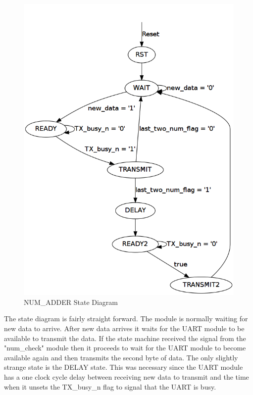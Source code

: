 \documentclass{article}
\begin{document}
	\begin{figure}[h]
		\begin{center}
			\includegraphics[scale=0.3]{../dot/Part-6_state_machine.png}
			\caption{NUM\_ADDER State Diagram}
		\end{center}
	\end{figure}

The state diagram is fairly straight forward. The module is normally waiting for new data to arrive. After new data arrives it waits for the UART module to be available to transmit the data. If the state machine received the signal from the "num\_check" module then it proceeds to wait for the UART module to become available again and then transmits the second byte of data. The only slightly strange state is the DELAY state. This was necessary since the UART module has a one clock cycle delay between receiving new data to transmit and the time when it unsets the TX\_busy\_n flag to signal that the UART is busy. 
\end{document}
